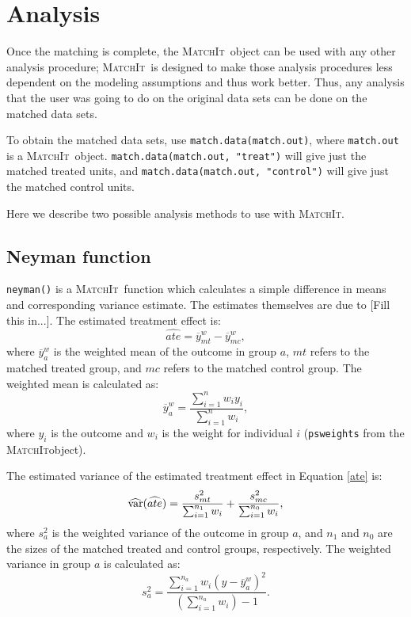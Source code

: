 \documentclass[oneside,letterpaper,titlepage]{article}
\newcommand{\MatchIt}{\textsc{MatchIt}}
\begin{document}
\section{Analysis}

Once the matching is complete, the \MatchIt\ object can be used with any other analysis procedure; \MatchIt\ is designed to 
make those analysis procedures less dependent on 
the modeling assumptions and thus work better.  Thus, any analysis that the user was going to do on the original data sets 
can be done on the matched data sets.

To obtain the matched data sets, use {\tt match.data(match.out)}, where {\tt match.out} is a \MatchIt\ object.
{\tt match.data(match.out, "treat")} will give just the matched treated units, and {\tt match.data(match.out, "control")}
will give just the matched control units.  

Here we describe two possible analysis methods to use with \MatchIt.    

\subsection{Neyman function}

{\tt neyman()} is a \MatchIt\ function which
calculates a simple difference in means and corresponding variance estimate.  The estimates themselves are due
to \cite{Neyman??} [Fill this in...].  The estimated treatment effect is:
\begin{equation}
\label{ate} 
\widehat{ate} = \overline{y}_{mt}^w-\overline{y}_{mc}^w,
\end{equation}
where $\overline{y}_a^w$ is the weighted mean of the outcome in group $a$, $mt$ refers to the matched treated group, and $mc$
refers to the matched control group.  The weighted mean is calculated as:
$$ \overline{y}_a^w = \frac{\sum_{i=1}^n w_i y_i}{\sum_{i=1}^n w_i},$$
where $y_i$ is the outcome and $w_i$ is the weight for individual $i$ ({\tt psweights} from the \MatchIt object).

The estimated variance of the estimated treatment effect in Equation \eqref{ate} is:
\begin{equation}
\label{estvar}
\widehat{{\rm var}}(\widehat{ate}) = \frac{s_{mt}^2}{\sum_{i=1}^{n_1} w_i} + \frac{s_{mc}^2}{\sum_{i=1}^{n_0} w_i},
\end{equation}
where $s_a^2$ is the weighted variance of the outcome in group $a$, and $n_1$ and $n_0$ are the sizes of the matched treated and control groups,
respectively.  The weighted variance in group $a$ is calculated as:
$$ s^2_{a} = \frac{\sum_{i=1}^{n_a} w_i (y-\overline{y}_a^w)^2}{(\sum_{i=1}^{n_a} w_i) - 1}.$$
\end{document}
